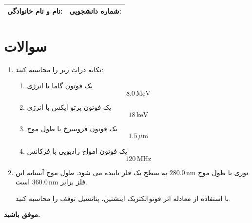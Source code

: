 \documentclass[12pt,a4paper]{article}
\begin{document}
	
	\begin{tabular}{|p{7cm}|p{7cm}|}
		\hline
		\textbf{نام و نام خانوادگی:} & \textbf{شماره دانشجویی:} \\
		\hline
	\end{tabular}
	
	\vspace{10pt}
	
	\section*{سوالات}
	
	\begin{enumerate}
		
		\item 
		تکانه ذرات زیر را محاسبه کنید:
		
		\begin{enumerate}
			\item[(الف)] یک فوتون گاما با انرژی
			\[
			8.0\,\mathrm{MeV}
			\]
			
			\item[(ب)] یک فوتون پرتو ایکس با انرژی
			\[
			18\,\mathrm{keV}
			\]
			
			\item[(پ)] یک فوتون فروسرخ با طول موج
			\[
			1.5\,\mu\mathrm{m}
			\]
			
			\item[(ت)] یک فوتون امواج رادیویی با فرکانس
			\[
			120\,\mathrm{MHz}
			\]
		\end{enumerate}
		
		\item
		نوری با طول موج \(280.0\,\mathrm{nm}\) به سطح یک فلز تابیده می شود. طول موج آستانه این فلز برابر \(360.0\,\mathrm{nm}\) است.
		
		با استفاده از معادله اثر فوتوالکتریک اینشتین، پتانسيل توقف  را محاسبه کنید.
		
	\end{enumerate}
	
	\vspace{10pt}
	\textbf{موفق باشید.}
	
\end{document}
